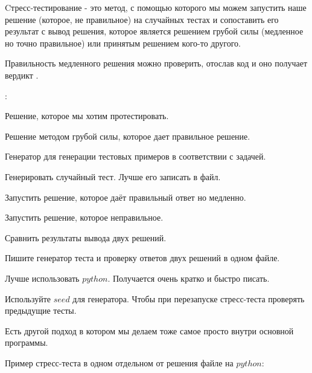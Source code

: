 
Cтресс-тестирование - это метод, с помощью которого мы можем запустить наше решение (которое, не правильное) на случайных тестах и сопоставить его результат с вывод решения, которое является решением грубой силы (медленное но точно правильное) или принятым решением кого-то другого.

Правильность медленного решения можно проверить, отослав код и оно получает вердикт .

:
\up
\begin{MyList}[0pt]
	\item Решение, которое мы хотим протестировать.
	\item Решение методом грубой силы, которое дает правильное решение.
	\item Генератор для генерации тестовых примеров в соответствии с задачей.
\end{MyList} \up \up


\up \up
\begin{MyList}[0pt]
	\item Генерировать случайный тест. Лучше его записать в файл.
	\item Запустить решение, которое даёт правильный ответ но медленно.
	\item Запустить решение, которое неправильное.
	\item Сравнить результаты вывода двух решений.
\end{MyList} \up \up


\up \up
\begin{MyList}[0pt]
	\item Пишите генератор теста и проверку ответов двух решений в одном файле.
	\item Лучше использовать $python$. Получается очень кратко и быстро писать.
	\item Используйте $seed$ для генератора. Чтобы при перезапуске стресс-теста проверять предыдущие тесты. 
\end{MyList}

Есть другой подход в котором мы делаем тоже самое просто внутри основной программы.

Пример стресс-теста в одном отдельном от решения файле на $python$:

\down


